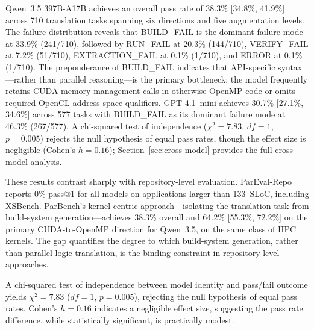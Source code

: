 \documentclass[conference]{IEEEtran}
\begin{document}
Qwen~3.5 397B-A17B achieves an overall pass rate of 38.3\% [34.8\%, 41.9\%] across 710 translation tasks spanning six directions and five augmentation levels. The failure distribution reveals that BUILD\_FAIL is the dominant failure mode at 33.9\% (241/710), followed by RUN\_FAIL at 20.3\% (144/710), VERIFY\_FAIL at 7.2\% (51/710), EXTRACTION\_FAIL at 0.1\% (1/710), and ERROR at 0.1\% (1/710). The preponderance of BUILD\_FAIL indicates that API-specific syntax---rather than parallel reasoning---is the primary bottleneck: the model frequently retains CUDA memory management calls in otherwise-OpenMP code or omits required OpenCL address-space qualifiers. GPT-4.1~mini achieves 30.7\% [27.1\%, 34.6\%] across 577 tasks with BUILD\_FAIL as its dominant failure mode at 46.3\% (267/577). A chi-squared test of independence ($\chi^2 = 7.83$, $df = 1$, $p = 0.005$) rejects the null hypothesis of equal pass rates, though the effect size is negligible (Cohen's $h = 0.16$); Section~\ref{sec:cross-model} provides the full cross-model analysis. %

These results contrast sharply with repository-level evaluation. ParEval-Repo~\cite{ParEvalRepo2025} reports 0\% pass@1 for all models on applications larger than 133~SLoC, including XSBench. ParBench's kernel-centric approach---isolating the translation task from build-system generation---achieves 38.3\% overall and 64.2\% [55.3\%, 72.2\%] on the primary CUDA-to-OpenMP direction for Qwen~3.5, on the same class of HPC kernels. The gap quantifies the degree to which build-system generation, rather than parallel logic translation, is the binding constraint in repository-level approaches.

A chi-squared test of independence between model identity and pass/fail outcome yields $\chi^2 = 7.83$ ($df = 1$, $p = 0.005$), rejecting the null hypothesis of equal pass rates. Cohen's $h = 0.16$ indicates a negligible effect size, suggesting the pass rate difference, while statistically significant, is practically modest. %
\end{document}
